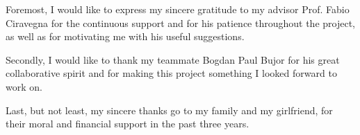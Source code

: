 \begin{acknowledgements}

Foremost, I would like to express my sincere gratitude to my advisor Prof. Fabio Ciravegna for the continuous support and for his patience throughout the project, as well as for motivating me with his useful suggestions.

Secondly, I would like to thank my teammate Bogdan Paul Bujor for his great collaborative spirit and for making this project something I looked forward to work on.

Last, but not least, my sincere thanks go to my family and my girlfriend, for their moral and financial support in the past three years.

\end{acknowledgements}